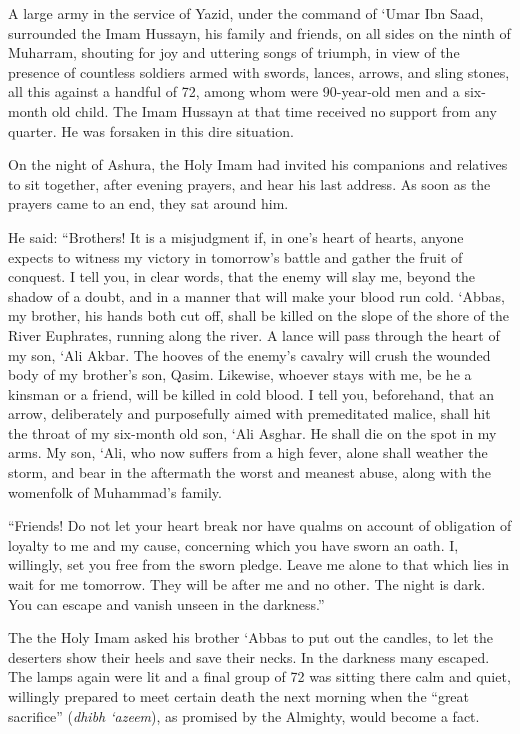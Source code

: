 \begin{quotationx}
A large army in the service of Yazid, under the command of `Umar Ibn Saad, surrounded the Imam Hussayn, his family and friends, on all sides on the ninth of Muharram, shouting for joy and uttering songs of triumph, in view of the presence of countless soldiers armed with swords, lances, arrows, and sling stones, all this against a handful of 72, among whom were 90-year-old men and a six-month old child. The Imam Hussayn at that time received no support from any quarter. He was forsaken in this dire situation.

On the night of Ashura, the Holy Imam had invited his companions and relatives to sit together, after evening prayers, and hear his last address. As soon as the prayers came to an end, they sat around him.

He said: ``Brothers! It is a misjudgment if, in one's heart of hearts, anyone expects to witness my victory in tomorrow's battle and gather the fruit of conquest. I tell you, in clear words, that the enemy will slay me, beyond the shadow of a doubt, and in a manner that will make your blood run cold. `Abbas, my brother, his hands both cut off, shall be killed on the slope of the shore of the River Euphrates, running along the river. A lance will pass through the heart of my son, `Ali Akbar. The hooves of the enemy's cavalry will crush the wounded body of my brother's son, Qasim. Likewise, whoever stays with me, be he a kinsman or a friend, will be killed in cold blood. I tell you, beforehand, that an arrow, deliberately and purposefully aimed with premeditated malice, shall hit the throat of my six-month old son, `Ali Asghar. He shall die on the spot in my arms. My son, `Ali, who now suffers from a high fever, alone shall weather the storm, and bear in the aftermath the worst and meanest abuse, along with the womenfolk of Muhammad's family.

``Friends! Do not let your heart break nor have qualms on account of obligation of loyalty to me and my cause, concerning which you have sworn an oath. I, willingly, set you free from the sworn pledge. Leave me alone to that which lies in wait for me tomorrow. They will be after me and no other. The night is dark. You can escape and vanish unseen in the darkness.''

The the Holy Imam asked his brother `Abbas to put out the candles, to let the deserters show their heels and save their necks. In the darkness many escaped. The lamps again were lit and a final group of 72 was sitting there calm and quiet, willingly prepared to meet certain death the next morning when the ``great sacrifice'' (\emph{dhibh `azeem}), as promised by the Almighty, would become a fact.


\end{quotationx}

